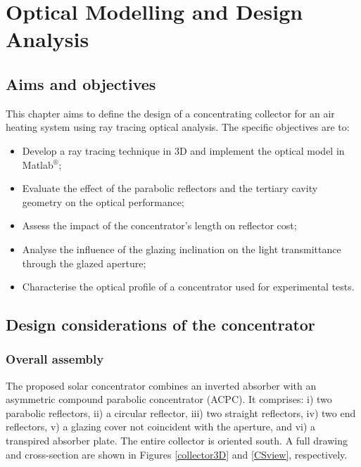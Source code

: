 \chapter{Optical Modelling and Design Analysis}
\label{Cap:Opt}

\section{Aims and objectives}

This chapter aims to define the design of a concentrating collector for an air heating system using ray tracing optical analysis. The specific objectives are to:

\begin{itemize}[topsep=5pt,partopsep=0pt] \itemsep0pt
	\item Develop a ray tracing technique in 3D and implement the optical model in Matlab$^{\circledR}$;
	\item Evaluate the effect of the parabolic reflectors and the tertiary cavity geometry on the optical performance;
	\item Assess the impact of the concentrator's length on reflector cost;
	\item Analyse the influence of the glazing inclination on the light transmittance through the glazed aperture;
	\item Characterise the optical profile of a concentrator used for experimental tests.
\end{itemize}

\section{Design considerations of the concentrator}

\subsection{Overall assembly}

The proposed solar concentrator combines an inverted absorber with an asymmetric compound parabolic concentrator (ACPC). It comprises: i) two parabolic reflectors, ii) a circular reflector, iii) two straight reflectors, iv) two end reflectors, v) a glazing cover not coincident with the aperture, and vi) a transpired absorber plate. The entire collector is oriented south. A full drawing and cross-section are shown in Figures \ref{collector3D} and \ref{CSview}, respectively. 

